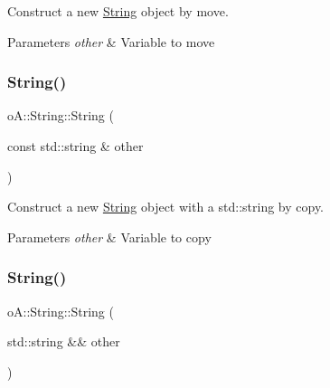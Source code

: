Construct a new \mbox{\hyperlink{classo_a_1_1_string}{String}} object by move. 


\begin{DoxyParams}{Parameters}
{\em other} & Variable to move \\
\hline
\end{DoxyParams}
\mbox{\label{classo_a_1_1_string_a7406ec03e50352320d8809a78e12a9fa}} 
\subsubsection{\texorpdfstring{String()}{String()}\hspace{0.1cm}{\footnotesize\ttfamily [4/7]}}
{\footnotesize\ttfamily o\+A\+::\+String\+::\+String (\begin{DoxyParamCaption}\item[{const std\+::string \&}]{other }\end{DoxyParamCaption})\hspace{0.3cm}{\ttfamily [inline]}}



Construct a new \mbox{\hyperlink{classo_a_1_1_string}{String}} object with a std\+::string by copy. 


\begin{DoxyParams}{Parameters}
{\em other} & Variable to copy \\
\hline
\end{DoxyParams}
\mbox{\label{classo_a_1_1_string_a0b5007bec6fe6f6c8917ecc4febbbd1c}} 
\subsubsection{\texorpdfstring{String()}{String()}\hspace{0.1cm}{\footnotesize\ttfamily [5/7]}}
{\footnotesize\ttfamily o\+A\+::\+String\+::\+String (\begin{DoxyParamCaption}\item[{std\+::string \&\&}]{other }\end{DoxyParamCaption})\hspace{0.3cm}{\ttfamily [inline]}}



